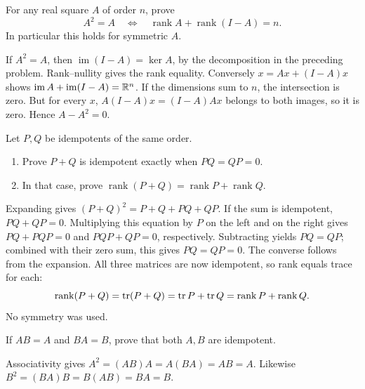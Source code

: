 \begin{problem}\label{ex:09:idempotent-ranks}
For any real square \(A\) of order \(n\), prove
\[
 A^2=A\quad\Longleftrightarrow\quad
 \operatorname{rank}A+\operatorname{rank}(I-A)=n.
\]
In particular this holds for symmetric \(A\).
\end{problem}
\begin{solution}
If \(A^2=A\), then
\(\operatorname{im}(I-A)=\ker A\), by the decomposition in the
preceding problem. Rank--nullity gives the rank equality.
Conversely \(x=Ax+(I-A)x\) shows
\(\operatorname{im}A+\operatorname{im}(I-A)=\mathbb R^n\).
If the dimensions sum to \(n\), the intersection is zero.
But for every \(x\),
\(A(I-A)x=(I-A)Ax\) belongs to both images, so it is zero.
Hence \(A-A^2=0\).
\end{solution}

\begin{problem}\label{ex:09:idempotent-sum}
Let \(P,Q\) be idempotents of the same order.
\begin{enumerate}
\item Prove \(P+Q\) is idempotent exactly when \(PQ=QP=0\).
\item In that case, prove
\(\operatorname{rank}(P+Q)=\operatorname{rank}P+\operatorname{rank}Q\).
\end{enumerate}
\end{problem}
\begin{solution}
Expanding gives \((P+Q)^2=P+Q+PQ+QP\).
If the sum is idempotent, \(PQ+QP=0\).
Multiplying this equation by \(P\) on the left and on the right gives
\(PQ+PQP=0\) and \(PQP+QP=0\), respectively.
Subtracting yields \(PQ=QP\); combined with their zero sum, this gives
\(PQ=QP=0\). The converse follows from the expansion.
All three matrices are now idempotent, so rank equals trace for each:
\[
 \operatorname{rank}(P+Q)=\operatorname{tr}(P+Q)=\operatorname{tr} P+\operatorname{tr} Q
 =\operatorname{rank}P+\operatorname{rank}Q.
\]
No symmetry was used.
\end{solution}

\begin{problem}\label{ex:09:absorption}
If \(AB=A\) and \(BA=B\), prove that both \(A,B\) are idempotent.
\end{problem}
\begin{solution}
Associativity gives
\(A^2=(AB)A=A(BA)=AB=A\).
Likewise \(B^2=(BA)B=B(AB)=BA=B\).
\end{solution}

